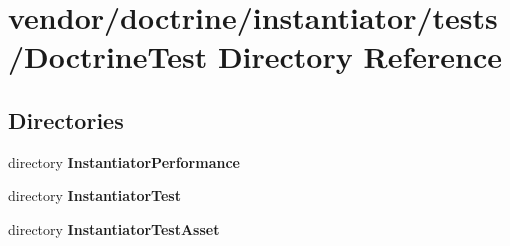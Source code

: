 \section{vendor/doctrine/instantiator/tests/\+Doctrine\+Test Directory Reference}
\label{dir_193d936802e4c6604f2159ee98621126}
\subsection*{Directories}
\begin{DoxyCompactItemize}
\item 
directory {\bf Instantiator\+Performance}
\item 
directory {\bf Instantiator\+Test}
\item 
directory {\bf Instantiator\+Test\+Asset}
\end{DoxyCompactItemize}
